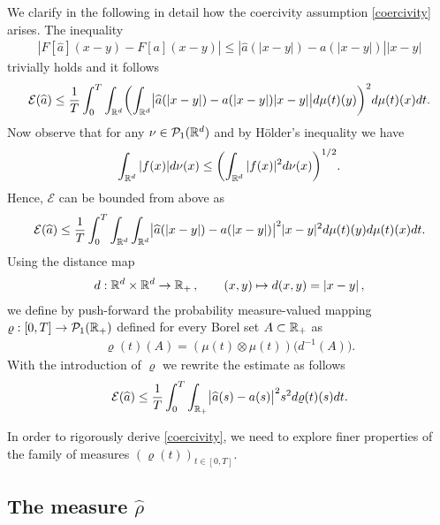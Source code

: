 We clarify in the following in detail how the coercivity assumption \eqref{coercivity} arises. The inequality %
\begin{align*}
|F[\widehat a](x-y) - F[a](x-y)|\leq |\widehat a(|x-y|) - a(|x-y|)| |x-y|
\end{align*}
trivially holds and it follows
\begin{align*}
	 \mathcal E(\widehat a)
		\leq\frac{1}{T}\int_0^T\int_{\mathbb{R}^d}\biggl(\int_{\mathbb{R}^d}\bigl|\widehat a(|x-y|)-a(|x-y|) |x-y|\bigr|
			d\mu(t)(y)\biggr)^2 d\mu(t)(x) dt.
\end{align*}
Now observe that for any $\nu\in \mathcal{P}_1(\mathbb{R}^d)$ and  by H\"older's inequality we have
\begin{align*}
	\int_{\mathbb{R}^d}|f(x)|d\nu(x)\leq\biggl(\int_{\mathbb{R}^d}|f(x)|^2 d\nu(x)\biggr)^{1/2}.
\end{align*}
Hence, $\mathcal E$ can be bounded from above as
\begin{align*}
	\mathcal E(\widehat a)\leq\frac{1}{T}\int_0^T\int_{\mathbb{R}^d}\int_{\mathbb{R}^d}\bigl|\widehat a(|x-y|)-a(|x-y|)
		\bigr|^2  |x-y|^2 d\mu(t)(y) d\mu(t)(x) dt.
\end{align*}
Using the distance map
\begin{align*}
	d:\mathbb{R}^d\times\mathbb{R}^d\rightarrow\mathbb{R}_+\,,\qquad (x,y)\mapsto d(x,y)=|x-y|\,,
\end{align*}
we define by push-forward the probability measure-valued mapping $\varrho:[0,T]\rightarrow \mathcal{P}_1(\mathbb{R}_+)$ defined for every Borel set $A\subset\mathbb{R}_+$ as
\begin{align*}
	\varrho(t)(A)=(\mu(t)\otimes\mu(t))\bigl(d^{-1}(A)\bigr).
\end{align*}
With the introduction of $\varrho$ we rewrite the estimate as follows
\begin{align}\label{midpoint}
	\mathcal E(\widehat a)\leq\frac{1}{T}\int_0^T\int_{\mathbb{R}_+}\bigl|\widehat a(s)-a(s)\bigr|^2 s^2d\varrho(t)(s) dt.
\end{align}

In order to rigorously derive \eqref{coercivity}, we need to explore finer properties of the family of measures $(\varrho(t))_{t \in [0,T]}$.

\subsection{The measure $\widehat{\rho}$}

